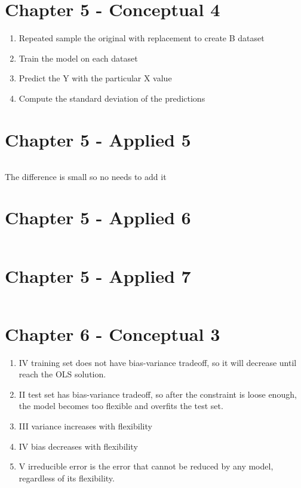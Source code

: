 \documentclass{article}
\begin{document}
\section{Chapter 5 - Conceptual 4}

\begin{enumerate}[label=(\alph*)]
\item Repeated sample the original with replacement to create B dataset
\item Train the model on each dataset
\item Predict the Y with the particular X value
\item Compute the standard deviation of the predictions
\end{enumerate}

\newpage
\section{Chapter 5 - Applied 5}

\inputminted{r}{src/ch5q5.R}

The difference is small so no needs to add it

\newpage
\section{Chapter 5 - Applied 6}
\inputminted{r}{src/ch5q6.R}

\newpage
\section{Chapter 5 - Applied 7}
\inputminted{r}{src/ch5q7.R}

\newpage
\section{Chapter 6 - Conceptual 3}
\begin{enumerate}[label=(\alph*)]
\item IV training set does not have bias-variance tradeoff, so it will decrease until reach the OLS solution.
\item II test set has bias-variance tradeoff, so after the constraint is loose enough, the model becomes too flexible and overfits the test set.
\item III variance increases with flexibility
\item IV bias decreases with flexibility
\item V irreducible error is the error that cannot be reduced by any model, regardless of its flexibility.
\end{enumerate}
\end{document}
